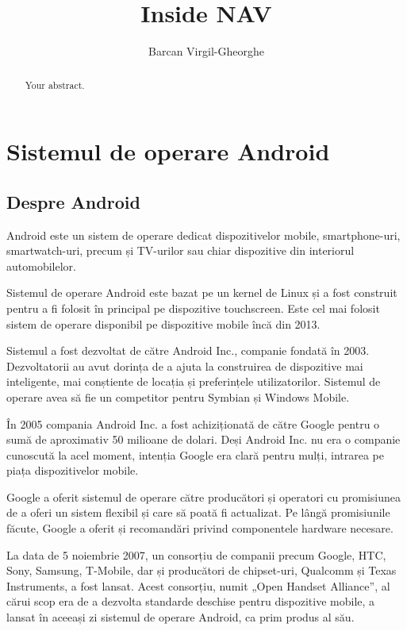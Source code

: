 \documentclass[12pt,a4paper]{article}
\title{Inside NAV}
\author{Barcan Virgil-Gheorghe}
\begin{document}
\maketitle

\begin{abstract}
Your abstract.
\end{abstract}

\section{Sistemul de operare Android}
\subsection{Despre Android}
Android este un sistem de operare dedicat dispozitivelor mobile, smartphone-uri, smartwatch-uri, precum și TV-urilor sau chiar dispozitive din interiorul automobilelor.

Sistemul de operare Android este bazat pe un kernel de Linux și a fost construit pentru a fi folosit în principal pe dispozitive touchscreen. Este cel mai folosit sistem de operare disponibil pe dispozitive mobile încă din 2013.

Sistemul a fost dezvoltat de către Android Inc., companie fondată în 2003. Dezvoltatorii au avut dorința de a ajuta la construirea de dispozitive mai inteligente, mai conștiente de locația și preferințele utilizatorilor. Sistemul de operare avea să fie un competitor pentru Symbian și Windows Mobile.

În 2005 compania Android Inc. a fost achiziționată de către Google pentru o sumă de aproximativ 50 milioane de dolari. Deși Android Inc. nu era o companie cunoscută la acel moment, intenția Google era clară pentru mulți, intrarea pe piața dispozitivelor mobile.
	
Google a oferit sistemul de operare către producători și operatori cu promisiunea de a oferi un sistem flexibil și care să poată fi actualizat. Pe lângă promisiunile făcute, Google a oferit și recomandări privind componentele hardware necesare.

La data de 5 noiembrie 2007, un consorțiu de companii precum Google, HTC, Sony, Samsung, T-Mobile, dar și producători de chipset-uri, Qualcomm și Texas Instruments, a fost lansat. Acest consorțiu, numit „Open Handset Alliance”, al cărui scop era de a dezvolta standarde deschise pentru dispozitive mobile, a lansat în aceeași zi sistemul de operare Android, ca prim produs al său.
\end{document}
